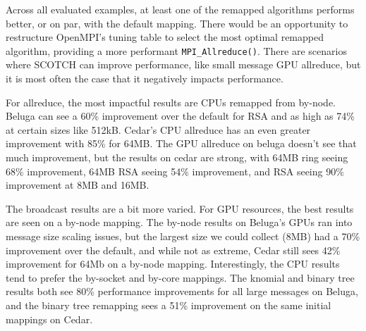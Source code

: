 





Across all evaluated examples, at least one of the remapped algorithms performs better, or on par, with the default mapping. 
There would be an opportunity to restructure OpenMPI's tuning table to select the most optimal remapped algorithm, providing a more performant \texttt{MPI\_Allreduce()}.
There are scenarios where SCOTCH can improve performance, like small message GPU allreduce, but it is most often the case that it negatively impacts performance.

For allreduce, the most impactful results are CPUs remapped from by-node.
Beluga can see a 60\% improvement over the default for RSA and as high as 74\% at certain sizes like 512kB.
Cedar's CPU allreduce has an even greater improvement with 85\% for 64MB.
The GPU allreduce on beluga doesn't see that much improvement, but the results on cedar are strong, with 64MB ring seeing 68\% improvement, 64MB RSA seeing 54\% improvement, and RSA seeing 90\% improvement at 8MB and 16MB.

The broadcast results are a bit more varied.
For GPU resources, the best results are seen on a by-node mapping.
The by-node results on Beluga's GPUs ran into message size scaling issues, but the largest size we could collect (8MB) had a 70\% improvement over the default, and while not as extreme, Cedar still sees 42\% improvement for 64Mb on a by-node mapping.
Interestingly, the CPU results tend to prefer the by-socket and by-core mappings. 
The knomial and binary tree results both see 80\% performance improvements for all large messages on Beluga, and the binary tree remapping sees a 51\% improvement on the same initial mappings on Cedar.

